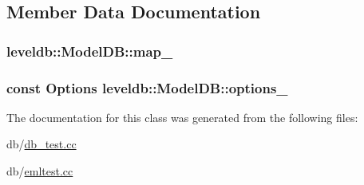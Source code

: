 \subsection{Member Data Documentation}
\hypertarget{classleveldb_1_1_model_d_b_ada58b7989a2d120b45f5fed2e4391c65}{}
\subsubsection[{map\+\_\+}]{ leveldb\+::\+Model\+D\+B\+::map\+\_\+\hspace{0.3cm}{\ttfamily [private]}}\label{classleveldb_1_1_model_d_b_ada58b7989a2d120b45f5fed2e4391c65}
\hypertarget{classleveldb_1_1_model_d_b_ae5aee6801bcd1c2d8843607abb2e723a}{}
\subsubsection[{options\+\_\+}]{\setlength{\rightskip}{0pt plus 5cm}const {\bf Options} leveldb\+::\+Model\+D\+B\+::options\+\_\+\hspace{0.3cm}{\ttfamily [private]}}\label{classleveldb_1_1_model_d_b_ae5aee6801bcd1c2d8843607abb2e723a}


The documentation for this class was generated from the following files\+:\begin{DoxyCompactItemize}
\item 
db/\hyperlink{db__test_8cc}{db\+\_\+test.\+cc}\item 
db/\hyperlink{emltest_8cc}{emltest.\+cc}\end{DoxyCompactItemize}
